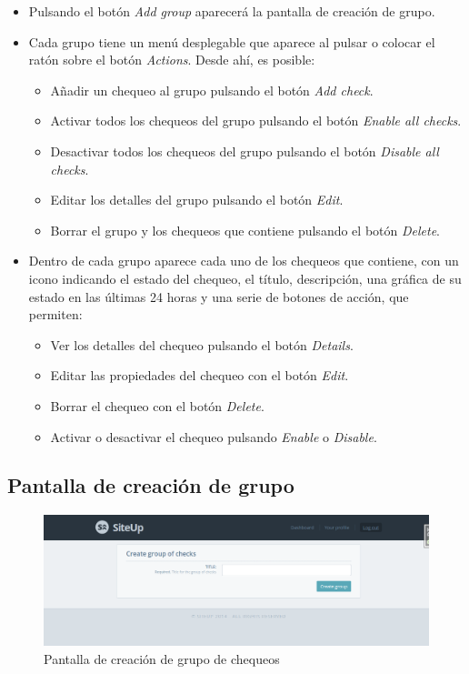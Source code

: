 \begin{itemize}
\item Pulsando el botón \textit{Add group} aparecerá la pantalla de creación de
  grupo.
\item Cada grupo tiene un menú desplegable que aparece al pulsar o colocar el
  ratón sobre el botón \textit{Actions}. Desde ahí, es posible:
  \begin{itemize}
  \item Añadir un chequeo al grupo pulsando el botón \textit{Add check}.
  \item Activar todos los chequeos del grupo pulsando el botón \textit{Enable
      all checks}.
  \item Desactivar todos los chequeos del grupo pulsando el botón
    \textit{Disable all checks}.
  \item Editar los detalles del grupo pulsando el botón \textit{Edit}.
  \item Borrar el grupo y los chequeos que contiene pulsando el botón \textit{Delete}.
  \end{itemize}
\item Dentro de cada grupo aparece cada uno de los chequeos que contiene, con un
  icono indicando el estado del chequeo, el título, descripción, una gráfica de
  su estado en las últimas 24 horas y una serie de botones de acción, que
  permiten:
  \begin{itemize}
  \item Ver los detalles del chequeo pulsando el botón \textit{Details}.
  \item Editar las propiedades del chequeo con el botón \textit{Edit}.
  \item Borrar el chequeo con el botón \textit{Delete}.
  \item Activar o desactivar el chequeo pulsando \textit{Enable} o
    \textit{Disable}.
  \end{itemize}

\end{itemize}


\subsection{Pantalla de creación de grupo}

\begin{figure}[htbp]
  \centering
  \includegraphics[width=\textwidth]{5_diseno/web-create-group}
  \caption{Pantalla de creación de grupo de chequeos}
  \label{fig:web-create-group}
\end{figure}

